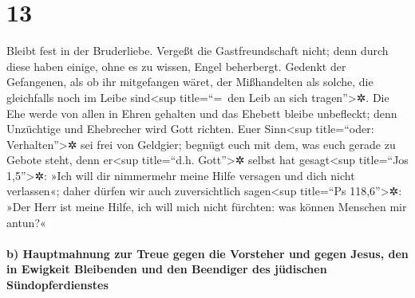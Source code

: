 \hypertarget{section-12}{%
\section{13}\label{section-12}}

 Bleibt fest in der Bruderliebe.  Vergeßt
die Gastfreundschaft nicht; denn durch diese haben einige, ohne es zu
wissen, Engel beherbergt.  Gedenkt der Gefangenen, als ob
ihr mitgefangen wäret, der Mißhandelten als solche, die gleichfalls noch
im Leibe sind\textless sup title=``=~den Leib an sich
tragen''\textgreater✲.  Die Ehe werde von allen in Ehren
gehalten und das Ehebett bleibe unbefleckt; denn Unzüchtige und
Ehebrecher wird Gott richten.  Euer Sinn\textless sup
title=``oder: Verhalten''\textgreater✲ sei frei von Geldgier; begnügt
euch mit dem, was euch gerade zu Gebote steht, denn er\textless sup
title=``d.h. Gott''\textgreater✲ selbst hat gesagt\textless sup
title=``Jos 1,5''\textgreater✲: »Ich will dir nimmermehr meine Hilfe
versagen und dich nicht verlassen«;  daher dürfen wir auch
zuversichtlich sagen\textless sup title=``Ps 118,6''\textgreater✲: »Der
Herr ist meine Hilfe, ich will mich nicht fürchten: was können Menschen
mir antun?«

\hypertarget{b-hauptmahnung-zur-treue-gegen-die-vorsteher-und-gegen-jesus-den-in-ewigkeit-bleibenden-und-den-beendiger-des-juxfcdischen-suxfcndopferdienstes}{%
\paragraph{b) Hauptmahnung zur Treue gegen die Vorsteher und gegen
Jesus, den in Ewigkeit Bleibenden und den Beendiger des jüdischen
Sündopferdienstes}\label{b-hauptmahnung-zur-treue-gegen-die-vorsteher-und-gegen-jesus-den-in-ewigkeit-bleibenden-und-den-beendiger-des-juxfcdischen-suxfcndopferdienstes}}

